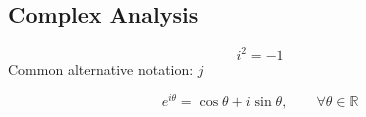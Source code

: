 \subsection{Complex Analysis}%
\label{sub:complex-analysis}

\begin{multicols}{2}

    \begin{CheatsheetEntryFrame}

        \begin{equation*}
            i^2 = -1
        \end{equation*}
        Common alternative notation: $j$

        \begin{equation*}
            e^{i \theta} = \cos{\theta} + i \sin{\theta}, \qquad \forall \theta \in \mathbb{R}
        \end{equation*}



\end{CheatsheetEntryFrame}
\end{multicols}
